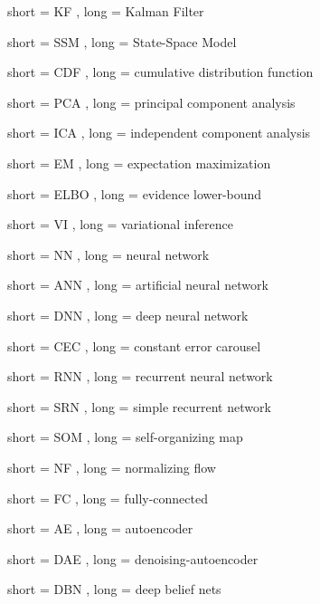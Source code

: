 {
	short = KF ,
	long = Kalman Filter
}

{
	short = SSM ,
	long = State-Space Model
}


{
	short = CDF ,
	long = cumulative distribution function
}

{
	short = PCA ,
	long = principal component analysis
}

{
	short = ICA ,
	long = independent component analysis
}

{
	short = EM ,
	long = expectation maximization
}

{
	short = ELBO ,
	long = evidence lower-bound
}

{
	short = VI ,
	long = variational inference
}


{
	short = NN ,
	long = neural network
}

{
	short = ANN ,
	long = artificial neural network
}

{
	short = DNN ,
	long = deep neural network
}



{
	short = CEC ,
	long = constant error carousel
}

{
	short = RNN ,
	long = recurrent neural network
}

{
	short = SRN ,
	long = simple recurrent network
}

{
	short = SOM ,
	long = self-organizing map
}

{
	short = NF ,
	long = normalizing flow
}

{
	short = FC ,
	long = fully-connected
}


{
	short = AE ,
	long = autoencoder
}

{
	short = DAE ,
	long = denoising-autoencoder
}

{
	short = DBN ,
	long = deep belief nets
}


